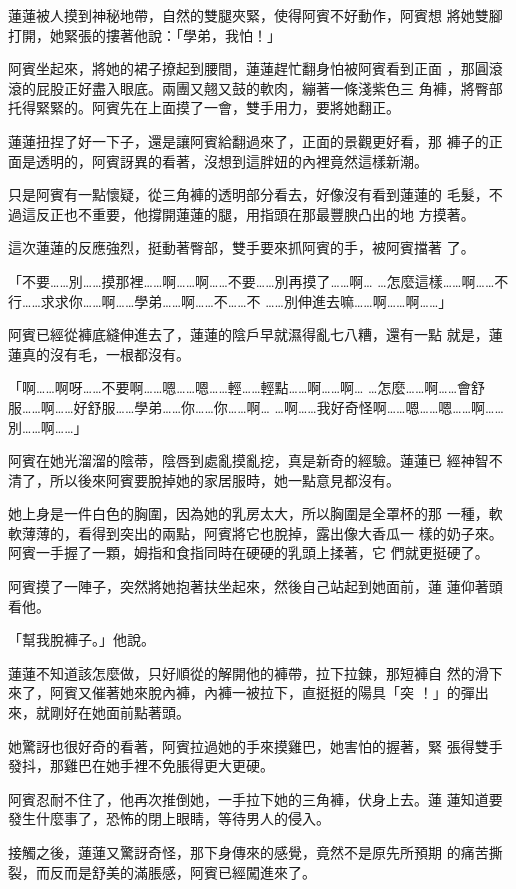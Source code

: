 蓮蓮被人摸到神秘地帶，自然的雙腿夾緊，使得阿賓不好動作，阿賓想
將她雙腳打開，她緊張的摟著他說：「學弟，我怕！」

阿賓坐起來，將她的裙子撩起到腰間，蓮蓮趕忙翻身怕被阿賓看到正面
，那圓滾滾的屁股正好盡入眼底。兩團又翹又鼓的軟肉，繃著一條淺紫色三
角褲，將臀部托得緊緊的。阿賓先在上面摸了一會，雙手用力，要將她翻正。

蓮蓮扭捏了好一下子，還是讓阿賓給翻過來了，正面的景觀更好看，那
褲子的正面是透明的，阿賓訝異的看著，沒想到這胖妞的內裡竟然這樣新潮。

只是阿賓有一點懷疑，從三角褲的透明部分看去，好像沒有看到蓮蓮的
毛髮，不過這反正也不重要，他撐開蓮蓮的腿，用指頭在那最豐腴凸出的地
方摸著。

這次蓮蓮的反應強烈，挺動著臀部，雙手要來抓阿賓的手，被阿賓擋著
了。

「不要……別……摸那裡……啊……啊……不要……別再摸了……啊…
…怎麼這樣……啊……不行……求求你……啊……學弟……啊……不……不
……別伸進去嘛……啊……啊……」

阿賓已經從褲底縫伸進去了，蓮蓮的陰戶早就濕得亂七八糟，還有一點
就是，蓮蓮真的沒有毛，一根都沒有。

「啊……啊呀……不要啊……嗯……嗯……輕……輕點……啊……啊…
…怎麼……啊……會舒服……啊……好舒服……學弟……你……你……啊…
…啊……我好奇怪啊……嗯……嗯……啊……別……啊……」

阿賓在她光溜溜的陰蒂，陰唇到處亂摸亂挖，真是新奇的經驗。蓮蓮已
經神智不清了，所以後來阿賓要脫掉她的家居服時，她一點意見都沒有。

她上身是一件白色的胸圍，因為她的乳房太大，所以胸圍是全罩杯的那
一種，軟軟薄薄的，看得到突出的兩點，阿賓將它也脫掉，露出像大香瓜一
樣的奶子來。阿賓一手握了一顆，姆指和食指同時在硬硬的乳頭上揉著，它
們就更挺硬了。

阿賓摸了一陣子，突然將她抱著扶坐起來，然後自己站起到她面前，蓮
蓮仰著頭看他。

「幫我脫褲子。」他說。

蓮蓮不知道該怎麼做，只好順從的解開他的褲帶，拉下拉鍊，那短褲自
然的滑下來了，阿賓又催著她來脫內褲，內褲一被拉下，直挺挺的陽具「突
！」的彈出來，就剛好在她面前點著頭。

她驚訝也很好奇的看著，阿賓拉過她的手來摸雞巴，她害怕的握著，緊
張得雙手發抖，那雞巴在她手裡不免脹得更大更硬。

阿賓忍耐不住了，他再次推倒她，一手拉下她的三角褲，伏身上去。蓮
蓮知道要發生什麼事了，恐怖的閉上眼睛，等待男人的侵入。

接觸之後，蓮蓮又驚訝奇怪，那下身傳來的感覺，竟然不是原先所預期
的痛苦撕裂，而反而是舒美的滿脹感，阿賓已經闖進來了。

